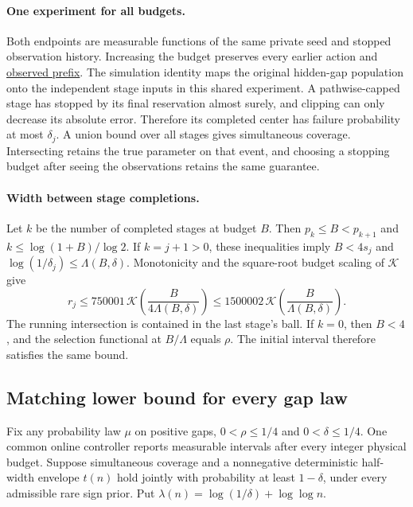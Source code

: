 \paragraph{One experiment for all budgets.}
Both endpoints are measurable functions of the same private seed and stopped
observation history. Increasing the budget preserves every earlier action
and \href{https://github.com/davidiach/adaptive-threshold-estimation/blob/ec31ac9931c8464fe89f5a4b043a6b2a23e4a65b/lean/ThresholdHC/Anytime/Compatibility.lean}{observed prefix}. The simulation identity maps the original hidden-gap
population onto the independent stage inputs in this shared experiment.
A pathwise-capped stage has stopped by its final reservation almost surely,
and clipping can only decrease its absolute error. Therefore its completed
center has failure probability at most $\delta_j$. A union bound over all
stages gives simultaneous coverage. Intersecting retains the true parameter
on that event, and choosing a stopping budget after seeing the observations
retains the same guarantee.

\paragraph{Width between stage completions.}
Let $k$ be the number of completed stages at budget $B$. Then
$p_k\le B<p_{k+1}$ and
$k\le\log(1+B)/\log2$. If $k=j+1>0$, these inequalities imply
$B<4s_j$ and $\log(1/\delta_j)\le\Lambda(B,\delta)$.
Monotonicity and the square-root budget scaling of $\mathcal K$ give
\[
 r_j\le750001\,\mathcal K\!\left(\frac{B}{4\Lambda(B,\delta)}\right)
       \le1500002\,\mathcal K\!\left(\frac{B}{\Lambda(B,\delta)}\right).
\]
The running intersection is contained in the last stage's ball. If $k=0$,
then $B<4$, and the selection functional at $B/\Lambda$ equals $\rho$.
The initial interval therefore satisfies the same bound.

\subsection{Matching lower bound for every gap law}

Fix any probability law $\mu$ on positive gaps, $0<\rho\le1/4$ and
$0<\delta\le1/4$. One common online controller reports measurable intervals
after every integer physical budget. Suppose simultaneous coverage and a
nonnegative deterministic half-width envelope $t(n)$ hold jointly with
probability at least $1-\delta$, under every admissible rare sign prior.
Put $\lambda(n)=\log(1/\delta)+\log\log n$.


